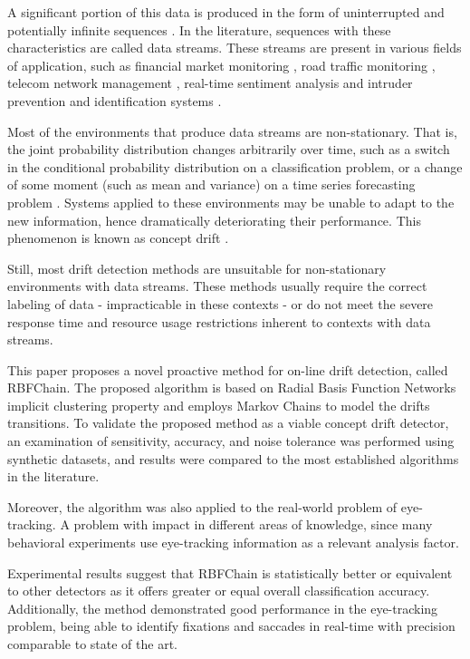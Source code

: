 \documentclass[preprint,12pt]{elsarticle}
\begin{document}
A significant portion of this data is produced in the form of uninterrupted and potentially infinite sequences \cite{Aggarwal:2006:DSM:1196418}.
In the literature,
sequences with these characteristics are called data streams.
These streams are present in various fields of application,
such as financial market monitoring  \cite{ZHOU:2015},
road traffic monitoring \cite{Wang:2015:EOV:2843092.2843464},
telecom network management \cite{delattre2015method},
real-time sentiment analysis  \cite{KRANJC2015187}
and intruder prevention and identification systems \cite{KENKRE:PAI:COLACO:2015}.

Most of the environments that produce data streams are non-stationary.
That is,
the joint probability distribution changes arbitrarily over time,
such as a switch in the conditional probability distribution on a classification problem,
or a change of some moment (such as mean and variance) on a time series forecasting problem \cite{tsymbal2004problem}.
Systems applied to these environments may be unable to adapt to the new information, hence dramatically deteriorating their performance.
This phenomenon is known as concept drift \cite{Gama:2014:DAF:2670967.2670971}.

Still, most drift detection methods are unsuitable for non-stationary environments with data streams.
These methods usually require the correct labeling of data - impracticable in these contexts -
 or do not meet the severe response time and resource usage restrictions inherent to contexts with data streams.

This paper proposes a novel proactive method for on-line drift detection,
called RBFChain.
The proposed algorithm is based on Radial Basis Function Networks implicit clustering property
and employs Markov Chains to model the drifts transitions.
To validate the proposed method as a viable concept drift detector,
an examination of sensitivity, accuracy,
and noise tolerance was performed using synthetic datasets,
and results were compared to the most established algorithms in the literature.

Moreover, the algorithm was also applied to the real-world problem of eye-tracking.
A problem with impact in different areas of knowledge, since many behavioral experiments use eye-tracking information as a relevant analysis factor.

Experimental results suggest that RBFChain is statistically better or equivalent to other detectors as it offers greater or equal overall classification accuracy.
Additionally, the method demonstrated good performance in the eye-tracking problem,
being able to identify fixations and saccades in real-time with precision comparable to state of the art.
\end{document}
